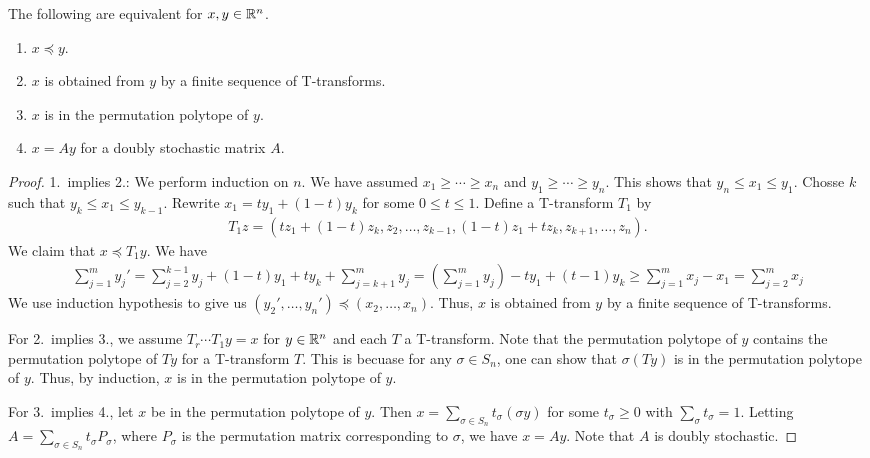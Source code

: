\begin{theorem}
    The following are equivalent for $x,y \in \mathbb{R}^{n}$.
    \begin{enumerate}
        \item $x \preceq y$.
        \item $x$ is obtained from $y$ by a finite sequence of T-transforms.
        \item $x$ is in the permutation polytope of $y$.
        \item $x = Ay$ for a doubly stochastic matrix $A$.
    \end{enumerate}
\end{theorem}
\begin{proof}
    1.~implies 2.: We perform induction on $n$. We have assumed $x_{1} \geq \cdots \geq x_{n}$ and $y_{1} \geq \cdots \geq y_{n}$. This shows that $y_{n} \leq x_{1} \leq y_{1}$. Chosse $k$ such that $y_{k} \leq x_{1} \leq y_{k-1}$. Rewrite $x_{1} = ty_{1} + (1-t)y_{k}$ for some $0 \leq t \leq 1$. Define a T-transform $T_{1}$ by
    \begin{align}
        T_{1}z = (tz_{1} + (1-t)z_{k},z_{2},\ldots,z_{k-1},(1-t)z_{1}+tz_{k},z_{k+1},\ldots,z_{n}).
    \end{align}
    We claim that $x \preceq T_{1}y$. We have
    \begin{align}
        \sum_{j=1}^{m} y_{j}' = \sum_{j=2}^{k-1} y_{j} + (1-t)y_{1} + ty_{k} + \sum_{j=k+1}^{m} y_{j} = \left(\sum_{j=1}^{m} y_{j}\right)-ty_{1}+(t-1)y_{k} \geq \sum_{j=1}^{m} x_{j} - x_{1} = \sum_{j=2}^{m} x_{j}
    \end{align}
    We use induction hypothesis to give us $(y_{2}',\ldots,y_{n}') \preceq (x_{2},\ldots,x_{n})$. Thus, $x$ is obtained from $y$ by a finite sequence of T-transforms.

    For 2.~implies 3., we assume $T_{r} \cdots T_{1} y = x$ for $y \in \mathbb{R}^{n}$ and each $T$ a T-transform. Note that the permutation polytope of $y$ contains the permutation polytope of $Ty$ for a T-transform $T$. This is becuase for any $\sigma \in S_{n}$, one can show that $\sigma(Ty)$ is in the permutation polytope of $y$. Thus, by induction, $x$ is in the permutation polytope of $y$.

    For 3.~implies 4., let $x$ be in the permutation polytope of $y$. Then $x = \sum_{\sigma \in S_{n}} t_{\sigma}(\sigma y)$ for some $t_{\sigma} \geq 0$ with $\sum_{\sigma} t_{\sigma} = 1$. Letting $A = \sum_{\sigma \in S_{n}} t_{\sigma} P_{\sigma}$, where $P_{\sigma}$ is the permutation matrix corresponding to $\sigma$, we have $x = Ay$. Note that $A$ is doubly stochastic.


\end{proof}
